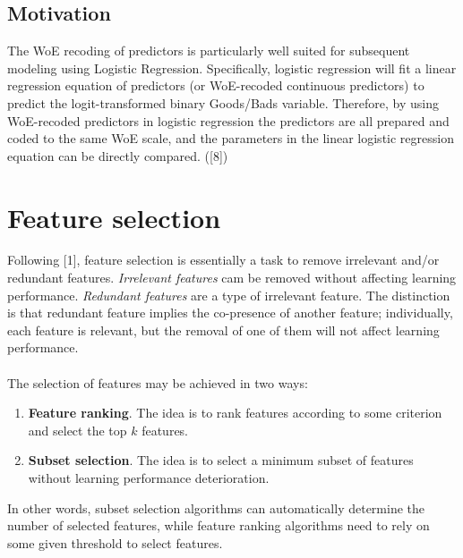 \documentclass[10pt]{article}\usepackage[]{graphicx}\usepackage[]{color}
\begin{document}
\subsection{Motivation}
The WoE recoding of predictors is particularly well suited for subsequent modeling using Logistic
Regression. Specifically, logistic regression will fit a linear regression equation of predictors (or WoE-recoded continuous predictors) to predict the logit-transformed binary Goods/Bads variable. Therefore, by using WoE-recoded predictors in logistic regression the predictors are all prepared and coded to the same WoE scale, and the parameters in the linear logistic regression
equation can be directly compared. ([8])


\clearpage
\section{Feature selection}
Following [1], feature selection is essentially a task to remove irrelevant and/or redundant features. \textit{Irrelevant features} cam be removed without affecting learning performance. \textit{Redundant features} are a type of irrelevant feature. The distinction is that redundant feature implies the co-presence of another feature; individually, each feature is relevant, but the removal of one of them will not affect learning performance. 

\paragraph{}
The selection of features may be achieved in two ways:
\begin{enumerate}
\item \textbf{Feature ranking}. The idea is to rank features according to some criterion and select the top $k$ features.
\item \textbf{Subset selection}. The idea is to select a minimum subset of features without learning performance deterioration.  
\end{enumerate}
In other words, subset selection algorithms can automatically determine the number of selected features, while feature ranking algorithms need to rely on some given threshold to select features. 
\end{document}

